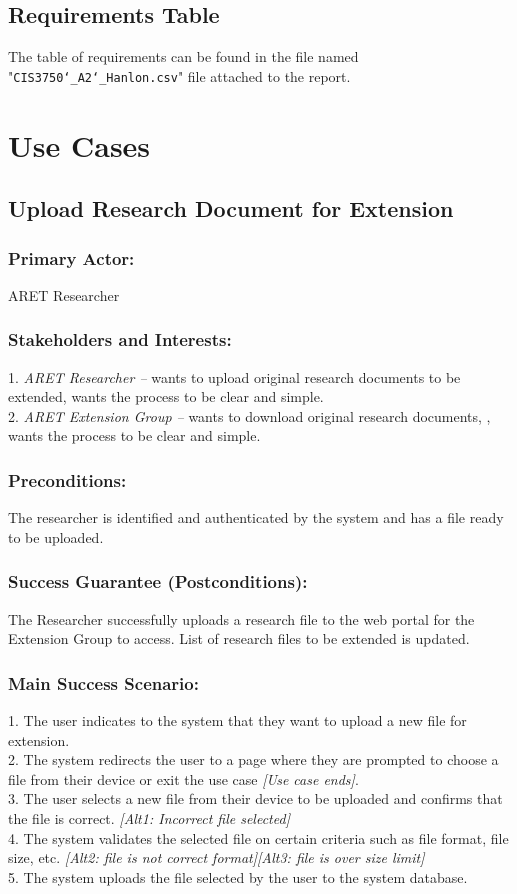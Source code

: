 \documentclass[12pt,letterpaper]{article}
\begin{document}
\subsection{Requirements Table}
The table of requirements can be found in the file named "\texttt{CIS3750\char`_A2\char`_Hanlon.csv}" file attached to the report.

\clearpage
\section{Use Cases}

\subsection{Upload Research Document for Extension}
\subsubsection*{Primary Actor:} ARET Researcher
\subsubsection*{Stakeholders and Interests:}
1. \emph{ARET Researcher --} wants to upload original research documents to be extended, wants the process to be clear and simple.\\[10pt]
2. \emph{ARET Extension Group --} wants to download original research documents, , wants the process to be clear and simple.

\subsubsection*{Preconditions:}
The researcher is identified and authenticated by the system and has a file ready to be uploaded.

\subsubsection*{Success Guarantee (Postconditions):}
The Researcher successfully uploads a research file to the web portal for the Extension Group to access. List of research files to be extended is updated.

\subsubsection*{Main Success Scenario:}
1. The user indicates to the system that they want to upload a new file for extension.\\
2. The system redirects the user to a page where they are prompted to choose a file from their device or exit the use case \emph{[Use case ends]}.\\
3. The user selects a new file from their device to be uploaded and confirms that the file is correct. \emph{[Alt1: Incorrect file selected]}\\
4. The system validates the selected file on certain criteria such as file format, file size, etc. \emph{[Alt2: file is not correct format][Alt3: file is over size limit]}\\
5. The system uploads the file selected by the user to the system database. 
\end{document}
